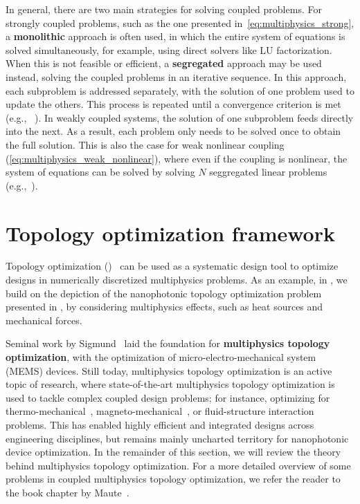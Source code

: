  In general, there are two main strategies for solving coupled problems. For strongly coupled problems, 
 such as the one presented in~\eqref{eq:multiphysics_strong}, a \textbf{monolithic} approach is often used, in which the entire system of 
 equations is solved simultaneously, for example, using direct solvers like LU factorization. When this is not feasible or 
 efficient, a \textbf{segregated} approach may be used instead, solving the coupled problems in an iterative sequence. In this 
 approach, each subproblem is addressed separately, with the solution of one problem used to update the others. This process 
 is repeated until a convergence criterion is met (e.g., ~\cite{ownpub5}). In weakly coupled systems, the solution of one subproblem feeds directly into the next. 
 As a result, each problem only needs to be solved once to obtain the full solution. This is also the case for 
 weak nonlinear coupling (\eqref{eq:multiphysics_weak_nonlinear}), where even if the coupling is nonlinear, the system of equations
 can be solved by solving $N$ seggregated linear problems (e.g.,~\cite{ownpub0}).
    
 \section{Topology optimization framework}\label{sec:topopt_theory}
 Topology optimization ()~\cite{topopt_book} can be used as a systematic design tool to optimize designs in numerically discretized multiphysics problems. 
 As an example, in , we build on the depiction of the nanophotonic topology optimization problem presented in , by considering
 multiphysics effects, such as heat sources and mechanical forces.

 Seminal work by Sigmund~\cite{MEMS_multi} laid the foundation for \textbf{multiphysics topology optimization}, with the optimization of micro-electro-mechanical system (MEMS) devices. 
 Still today, multiphysics topology optimization is an active topic of research, where state-of-the-art multiphysics topology optimization is used to tackle complex coupled design problems; for instance, optimizing for thermo-mechanical~\cite{third_thermal}, magneto-mechanical~\cite{magneto}, or fluid-structure interaction~\cite{fsint} problems. 
 This has enabled highly efficient and integrated designs across engineering disciplines, but remains mainly uncharted territory for nanophotonic device optimization. In the remainder of this section, we will review the theory behind multiphysics topology optimization. For a more detailed overview of some problems in coupled multiphysics
 topology optimization, we refer the reader to the book chapter by Maute~\cite{coupled_topopt}.
    
